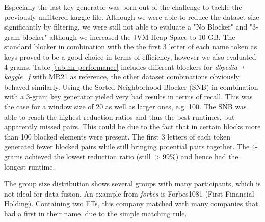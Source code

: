 \documentclass[11pt,titlepage,oneside,openany]{book}
\begin{document}
Especially the last key generator was born out of the challenge to tackle the previously unfiltered kaggle file. Although we were able to reduce the dataset size significantly by filtering, we were still not able to evaluate a "No Blocker" and "3-gram blocker" although we increased the JVM Heap Space to 10 GB.
The standard blocker in combination with the the first 3 letter of each name token as keys proved to be a good choice in terms of efficiency, however we also evaluated 4-grams. Table \ref{tab:mr-performance} includes different blockers for \textit{dbpedia + kaggle\_f} with MR21 as reference, the other dataset combinations obviously behaved similarly. Using the Sorted Neighborhood Blocker (SNB) in combination with a 3-gram key generator yieled very bad results in terms of recall. This was the case for a window size of 20 as well as larger ones, e.g. 100. The SNB was able to reach the highest reduction ratios and thus the best runtimes, but apparently missed pairs. This could be due to the fact that in certain blocks more than 100 blocked elements were present. The first 3 letters of each token generated fewer blocked pairs while still bringing potential pairs together. The 4-grams achieved the lowest reduction ratio (still $>$99\%) and hence had the longest runtime.

The group size distribution shows several groups with many participants, which is not ideal for data fusion. An example from \textit{forbes} is Forbes1081 (First Financial Holding). Containing two FTs, this company matched with many companies that had a first in their name, due to the simple matching rule.
\end{document}
